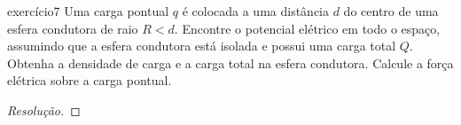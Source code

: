 \begin{exercício}{}{exercício7}
    Uma carga pontual \(q\) é colocada a uma distância \(d\) do centro de uma esfera condutora de raio \(R < d\). Encontre o potencial elétrico em todo o espaço, assumindo que a esfera condutora está isolada e possui uma carga total \(Q\). Obtenha a densidade de carga e a carga total na esfera condutora. Calcule a força elétrica sobre a carga pontual.
\end{exercício}
\begin{proof}[Resolução]

\end{proof}
